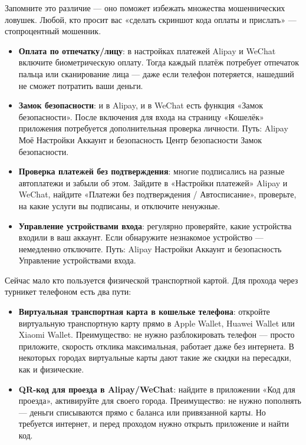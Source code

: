 Запомните это различие — оно поможет избежать множества мошеннических ловушек. Любой, кто просит вас «сделать скриншот кода оплаты и прислать» — стопроцентный мошенник.


\begin{itemize}
  \item \textbf{Оплата по отпечатку/лицу}: в настройках платежей Alipay и WeChat включите биометрическую оплату. Тогда каждый платёж потребует отпечаток пальца или сканирование лица — даже если телефон потеряется, нашедший не сможет потратить ваши деньги.
  \item \textbf{Замок безопасности}: и в Alipay, и в WeChat есть функция «Замок безопасности». После включения для входа на страницу «Кошелёк» приложения потребуется дополнительная проверка личности. Путь: Alipay Моё Настройки Аккаунт и безопасность Центр безопасности Замок безопасности.
  \item \textbf{Проверка платежей без подтверждения}: многие подписались на разные автоплатежи и забыли об этом. Зайдите в «Настройки платежей» Alipay и WeChat, найдите «Платежи без подтверждения / Автосписание», проверьте, на какие услуги вы подписаны, и отключите ненужные.
  \item \textbf{Управление устройствами входа}: регулярно проверяйте, какие устройства входили в ваш аккаунт. Если обнаружите незнакомое устройство — немедленно отключите. Путь: Alipay Настройки Аккаунт и безопасность Управление устройствами входа.
\end{itemize}


Сейчас мало кто пользуется физической транспортной картой. Для прохода через турникет телефоном есть два пути:

\begin{itemize}
  \item \textbf{Виртуальная транспортная карта в кошельке телефона}: откройте виртуальную транспортную карту прямо в Apple Wallet, Huawei Wallet или Xiaomi Wallet. Преимущество: не нужно разблокировать телефон — просто приложите, скорость отклика максимальная, работает даже без интернета. В некоторых городах виртуальные карты дают такие же скидки на пересадки, как и физические.
  \item \textbf{QR-код для проезда в Alipay/WeChat}: найдите в приложении «Код для проезда», активируйте для своего города. Преимущество: не нужно пополнять — деньги списываются прямо с баланса или привязанной карты. Но требуется интернет, и перед проходом нужно открыть приложение и найти код.
\end{itemize}

